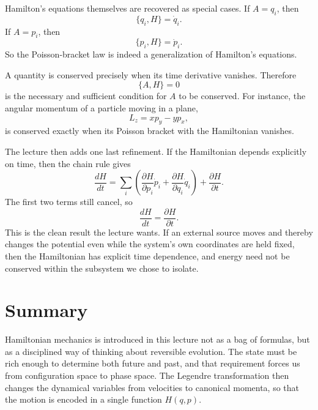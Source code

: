 Hamilton's equations themselves are recovered as special cases. If \(A=q_i\), then
\begin{equation}
\{q_i,H\}=\dot q_i.
\end{equation}
If \(A=p_i\), then
\begin{equation}
\{p_i,H\}=\dot p_i.
\end{equation}
So the Poisson-bracket law is indeed a generalization of Hamilton's equations.

A quantity is conserved precisely when its time derivative vanishes. Therefore
\begin{equation}
\{A,H\}=0
\end{equation}
is the necessary and sufficient condition for \(A\) to be conserved. For instance, the angular momentum of a particle moving in a plane,
\begin{equation}
L_z=xp_y-yp_x,
\end{equation}
is conserved exactly when its Poisson bracket with the Hamiltonian vanishes.

The lecture then adds one last refinement. If the Hamiltonian depends explicitly on time, then the chain rule gives
\begin{equation}
\frac{dH}{dt}
=
\sum_i
\left(
\frac{\partial H}{\partial p_i}\dot p_i
+
\frac{\partial H}{\partial q_i}\dot q_i
\right)
+
\frac{\partial H}{\partial t}.
\end{equation}
The first two terms still cancel, so
\begin{equation}
\frac{dH}{dt}=\frac{\partial H}{\partial t}.
\end{equation}
This is the clean result the lecture wants. If an external source moves and thereby changes the potential even while the system's own coordinates are held fixed, then the Hamiltonian has explicit time dependence, and energy need not be conserved within the subsystem we chose to isolate.

\section{Summary}

Hamiltonian mechanics is introduced in this lecture not as a bag of formulas, but as a disciplined way of thinking about reversible evolution. The state must be rich enough to determine both future and past, and that requirement forces us from configuration space to phase space. The Legendre transformation then changes the dynamical variables from velocities to canonical momenta, so that the motion is encoded in a single function \(H(q,p)\).

